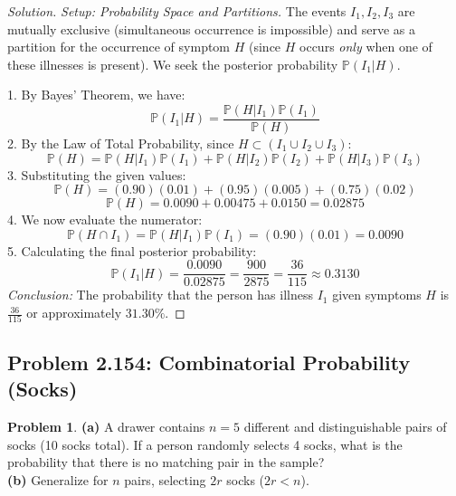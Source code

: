 \documentclass[11pt]{article}
\theoremstyle{definition}
\newtheorem{problem}{Problem}[section]
\theoremstyle{remark}
\newcommand{\Prob}{\mathbb{P}}
\begin{document}
\begin{proof}[Solution]
\textit{Setup: Probability Space and Partitions.}
The events $I_1, I_2, I_3$ are mutually exclusive (simultaneous occurrence is impossible) and serve as a partition for the occurrence of symptom $H$ (since $H$ occurs \textit{only} when one of these illnesses is present). We seek the posterior probability $\Prob(I_1 | H)$.

1. By Bayes' Theorem, we have:
   \[ \Prob(I_1 | H) = \frac{\Prob(H | I_1) \Prob(I_1)}{\Prob(H)} \]
2. By the Law of Total Probability, since $H \subset (I_1 \cup I_2 \cup I_3)$:
   \[ \Prob(H) = \Prob(H | I_1)\Prob(I_1) + \Prob(H | I_2)\Prob(I_2) + \Prob(H | I_3)\Prob(I_3) \]
3. Substituting the given values:
   \[ \Prob(H) = (0.90)(0.01) + (0.95)(0.005) + (0.75)(0.02) \]
   \[ \Prob(H) = 0.0090 + 0.00475 + 0.0150 = 0.02875 \]
4. We now evaluate the numerator:
   \[ \Prob(H \cap I_1) = \Prob(H | I_1)\Prob(I_1) = (0.90)(0.01) = 0.0090 \]
5. Calculating the final posterior probability:
   \[ \Prob(I_1 | H) = \frac{0.0090}{0.02875} = \frac{900}{2875} = \frac{36}{115} \approx 0.3130 \]
\textit{Conclusion:} The probability that the person has illness $I_1$ given symptoms $H$ is $\frac{36}{115}$ or approximately $31.30\%$.
\end{proof}

\subsection{Problem 2.154: Combinatorial Probability (Socks)}
\begin{problem}
\textbf{(a)} A drawer contains $n=5$ different and distinguishable pairs of socks (10 socks total). If a person randomly selects 4 socks, what is the probability that there is no matching pair in the sample?\\
\textbf{(b)} Generalize for $n$ pairs, selecting $2r$ socks ($2r < n$).
\end{problem}
\end{document}
